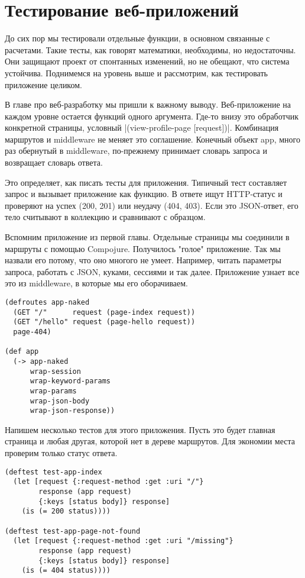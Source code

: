 \section{Тестирование веб-приложений}

До сих пор мы тестировали отдельные функции, в основном связанные с
расчетами. Такие тесты, как говорят математики, необходимы, но недостаточны. Они
защищают проект от спонтанных изменений, но не обещают, что система
устойчива. Поднимемся на уровень выше и рассмотрим, как тестировать приложение
целиком.

В главе про веб-разработку мы пришли к важному выводу. Веб-приложение на каждом
уровне остается функций одного аргумента. Где-то внизу это обработчик конкретной
страницы, условный \spverb|(view-profile-page [request])|. Комбинация маршрутов и
middleware не меняет это соглашение. Конечный объект app, много раз обернутый в
middleware, по-прежнему принимает словарь запроса и возвращает словарь ответа.

Это определяет, как писать тесты для приложения. Типичный тест составляет запрос
и вызывает приложение как функцию. В ответе ищут HTTP-статус и проверяют на
успех (200, 201) или неудачу (404, 403). Если это JSON-ответ, его тело считывают
в коллекцию и сравнивают с образцом.

Вспомним приложение из первой главы. Отдельные страницы мы соединили в маршруты
с помощью Compojure. Получилось "голое" приложение. Так мы назвали его потому,
что оно многого не умеет. Например, читать параметры запроса, работать с JSON,
куками, сессиями и так далее. Приложение узнает все это из middleware, в которые
мы его оборачиваем.

\begin{verbatim}
(defroutes app-naked
  (GET "/"      request (page-index request))
  (GET "/hello" request (page-hello request))
  page-404)

(def app
  (-> app-naked
      wrap-session
      wrap-keyword-params
      wrap-params
      wrap-json-body
      wrap-json-response))
\end{verbatim}

Напишем несколько тестов для этого приложения. Пусть это будет главная страница
и любая другая, которой нет в дереве маршрутов. Для экономии места проверим
только статус ответа.

\begin{verbatim}
(deftest test-app-index
  (let [request {:request-method :get :uri "/"}
        response (app request)
        {:keys [status body]} response]
    (is (= 200 status))))

(deftest test-app-page-not-found
  (let [request {:request-method :get :uri "/missing"}
        response (app request)
        {:keys [status body]} response]
    (is (= 404 status))))
\end{verbatim}


